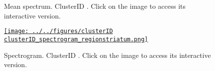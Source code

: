 \documentclass[12pt]{article}
\begin{document}
{\begin{figure}
\begin{center}
            \caption{Mean spectrum. ClusterID \clusterID. Click on the image to
            access its interactive version.}

            \label{fig:meanSpectrum\clusterID}

        \end{center}
    \end{figure}

    \begin{figure}
        \begin{center}

            \href{http://www.gatsby.ucl.ac.uk/~rapela/sthita/reports/spectralAnalysis/figures/clusterID\clusterID_spectrogram_regionstriatum.html}{\texttt{[image: ../../figures/clusterID\\clusterID\_spectrogram\_regionstriatum.png]}}

            \caption{Spectrogram. ClusterID \clusterID. Click on the image to
            access its interactive version.}

            \label{fig:spectrogram\clusterID}

        \end{center}
    \end{figure}

    \clearpage
}
\end{document}
